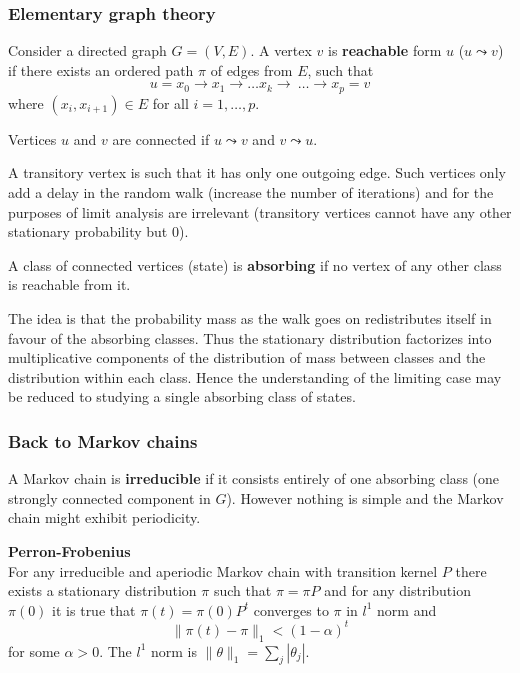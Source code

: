 \documentclass[a4paper]{article}
\begin{document}
\subsubsection{Elementary graph theory} %
\label{ssub:elementary_graph_theory}

Consider a directed graph $G=(V,E)$. A vertex $v$ is \textbf{reachable} form $u$
($u\leadsto v$) if there exists an ordered path $\pi$ of edges from $E$, such that
\[ u = x_0 \to x_1 \to \ldots x_k \to\ \ldots \to x_p = v\]
where $(x_i,x_{i+1})\in E$ for all $i=1,\ldots, p$.

Vertices $u$ and $v$ are connected if $u\leadsto v$ and $v\leadsto u$.

A transitory vertex is such that it has only one outgoing edge. Such vertices only
add a delay in the random walk (increase the number of iterations) and for the
purposes of limit analysis are irrelevant (transitory vertices cannot have any other
stationary probability but $0$).

A class of connected vertices (state) is \textbf{absorbing} if no vertex of any
other class is reachable from it.

The idea is that the probability mass as the walk goes on redistributes itself
in favour of the absorbing classes. Thus the stationary distribution factorizes
into multiplicative components of the distribution of mass between classes
and the distribution within each class. Hence the understanding of the limiting
case may be reduced to studying a single absorbing class of states.


\subsubsection{Back to Markov chains} %
\label{ssub:back_to_markov_chains}

A Markov chain is \textbf{irreducible} if it consists entirely of one absorbing
class (one strongly connected component in $G$). However nothing is simple and
the Markov chain might exhibit periodicity.

\noindent\textbf{Perron-Frobenius}\hfill\\
For any irreducible and aperiodic Markov chain with transition kernel $P$ there
exists a stationary distribution $\pi$ such that $\pi = \pi P$ and for any
distribution $\pi(0)$ it is true that $\pi(t) = \pi(0) P^t$ converges to $\pi$
in $l^1$ norm and
\[\|\pi(t) - \pi\|_1 < (1-\alpha)^t\]
for some $\alpha>0$. The $l^1$ norm is $\|\theta\|_1 = \sum_j |\theta_j|$.
\end{document}
